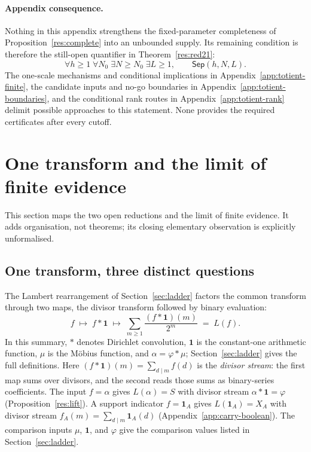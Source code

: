 \documentclass[11pt]{article}
\theoremstyle{definition}
\theoremstyle{remark}
\newcommand{\ph}{\varphi}
\begin{document}
{\paragraph{Appendix consequence.}
Nothing in this appendix strengthens the fixed-parameter completeness of
Proposition~\ref{res:complete} into an unbounded supply.  Its remaining condition is
therefore the still-open quantifier in Theorem~\ref{res:red21}:
\[
 \forall h\geq1\;\forall N_0\;\exists N\geq N_0\;\exists L\geq1,\qquad
 \mathsf{Sep}(h,N,L).
\]
The one-scale mechanisms and conditional implications in
Appendix~\ref{app:totient-finite}, the candidate inputs and no-go boundaries
in Appendix~\ref{app:totient-boundaries}, and the conditional rank routes in
Appendix~\ref{app:totient-rank} delimit possible approaches to this
statement.  None provides the required certificates after every cutoff.

}

\section{One transform and the limit of finite evidence}
\label{sec:architecture}

\noindent This section maps the two open reductions and the limit of finite
evidence.  It adds organisation, not theorems; its closing elementary
observation is explicitly unformalised.

\subsection{One transform, three distinct questions}
\label{sec:one-transform}

The Lambert rearrangement of Section~\ref{sec:ladder} factors the common
transform through two maps, the divisor transform followed by binary
evaluation:
\[
 f\;\longmapsto\;f*\mathbf 1\;\longmapsto\;
 \sum_{m\ge1}\frac{(f*\mathbf 1)(m)}{2^m}\;=\;L(f).
\]
In this summary, \(*\) denotes Dirichlet convolution,
\(\mathbf 1\) is the constant-one arithmetic function, \(\mu\) is the
M\"obius function, and \(\alpha=\ph*\mu\); Section~\ref{sec:ladder} gives
the full definitions.
Here \((f*\mathbf 1)(m)=\sum_{d\mid m}f(d)\) is the \emph{divisor stream}:
the first map sums over divisors, and the second reads those sums as
binary-series coefficients.  The input \(f=\alpha\) gives
\(L(\alpha)=S\) with divisor stream \(\alpha*\mathbf 1=\ph\)
(Proposition~\ref{res:lift}).  A support indicator \(f=\mathbf 1_A\) gives
\(L(\mathbf 1_A)=X_A\) with divisor stream
\(f_A(m)=\sum_{d\mid m}\mathbf 1_A(d)\)
(Appendix~\ref{app:carry-boolean}).  The comparison inputs
\(\mu\), \(\mathbf 1\), and \(\ph\) give the comparison values listed in
Section~\ref{sec:ladder}.
\end{document}
